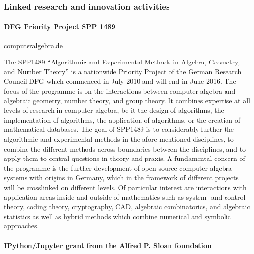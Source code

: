 \documentclass[a4paper,11pt]{article}
\begin{document}
\subsubsection{Linked research and innovation activities}



\paragraph{DFG Priority Project SPP 1489}
\url{computeralgebra.de}

The SPP1489 ``Algorithmic and Experimental Methods in Algebra, Geometry, and
Number Theory'' is a nationwide Priority Project of the German Research Council DFG  
which commenced in July  2010 and will end in June 2016. The focus of the programme 
is on the interactions between computer algebra and algebraic geometry, number theory, 
and group theory. It combines expertise at all levels of research in computer algebra, 
be it the design of algorithms, the implementation of algorithms, the application
of algorithms, or the creation of mathematical databases. The goal of SPP1489 is to 
considerably further the algorithmic and experimental methods in the afore mentioned
disciplines, to combine the different methods across boundaries between the disciplines, 
and to apply them to central questions in theory and praxis. A fundamental concern of the
programme is the further development of open source
computer algebra systems with origins in Germany, which in
the framework of different projects will be crosslinked on
different levels. Of particular interest are interactions with application areas inside
and outside of mathematics such as system- and control theory, coding
theory, cryptography, CAD, algebraic combinatorics, and algebraic
statistics as well as hybrid methods which combine numerical and
symbolic approaches. 


\paragraph{IPython/Jupyter grant from the Alfred P. Sloan foundation}
\end{document}
